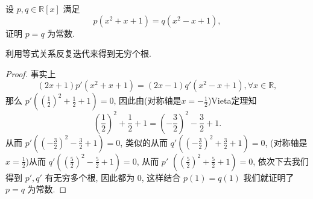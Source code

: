 \documentclass[../../main.tex]{subfiles}%
\begin{document}
\begin{example}
设 \( p,q \in \mathbb{R}[x] \) 满足
\[
p(x^2 + x + 1) = q(x^2 - x + 1),
\]
证明 \( p = q \) 为常数.
\end{example}
\begin{note}
利用等式关系反复迭代来得到无穷个根.
\end{note}
\begin{proof}

事实上
\[
(2x + 1)p'(x^2 + x + 1) = (2x - 1)q'(x^2 - x + 1), \forall x \in \mathbb{R},
\]
那么 \( p'\left( \left( \frac{1}{2} \right)^2 + \frac{1}{2} + 1 \right) = 0 \), 因此由(对称轴是$x=-\frac{1}{2}$)Vieta定理知
\[
\left( \frac{1}{2} \right)^2 + \frac{1}{2} + 1 = \left( -\frac{3}{2} \right)^2 - \frac{3}{2} + 1.
\]
从而 \( p'\left( \left( -\frac{3}{2} \right)^2 - \frac{3}{2} + 1 \right) = 0 \), 类似的从而 \( q'\left( \left( -\frac{3}{2} \right)^2 + \frac{3}{2} + 1 \right) = 0 \), (对称轴是$x=\frac{1}{2}$)从而 \( q'\left( \left( \frac{5}{2} \right)^2 - \frac{5}{2} + 1 \right) = 0 \), 从而 $p'$ $\left( \left( \frac{5}{2} \right)^2 + \frac{5}{2} + 1 \right) = 0$, 依次下去我们得到 \( p',q' \) 有无穷多个根, 因此都为 0, 这样结合 \( p(1) = q(1) \) 我们就证明了 \( p = q \) 为常数.

\end{proof}
\end{document}
